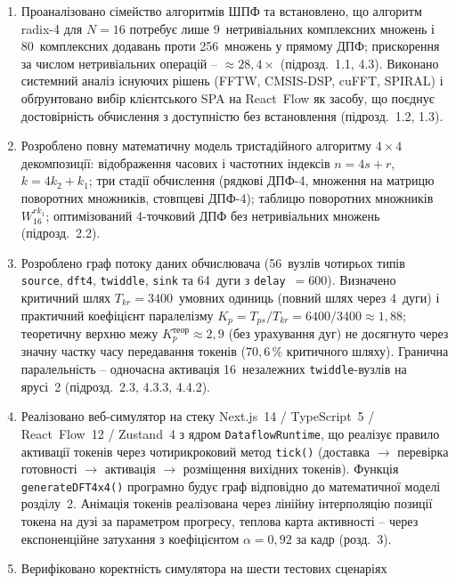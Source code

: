 \documentclass[
]{article}
\begin{document}
\begin{enumerate}
\def\labelenumi{\arabic{enumi}.}
\item
  Проаналізовано сімейство алгоритмів ШПФ та встановлено, що алгоритм
  radix-4 для \(N = 16\) потребує лише 9~нетривіальних комплексних
  множень і 80~комплексних додавань проти 256~множень у прямому ДПФ;
  прискорення за числом нетривіальних операцій --
  \(\approx 28,4 \times\) (підрозд.~1.1, 4.3). Виконано системний аналіз
  існуючих рішень (FFTW, CMSIS-DSP, cuFFT, SPIRAL) і обґрунтовано вибір
  клієнтського SPA на React~Flow як засобу, що поєднує достовірність
  обчислення з доступністю без встановлення (підрозд.~1.2, 1.3).
\item
  Розроблено повну математичну модель тристадійного алгоритму
  \(4 \times 4\) декомпозиції: відображення часових і частотних індексів
  \(n = 4s + r\), \(k = 4k_{2} + k_{1}\); три стадії
  обчислення (рядкові ДПФ-4, множення на матрицю поворотних множників,
  стовпцеві ДПФ-4); таблицю поворотних множників \(W_{16}^{rk_{1}}\);
  оптимізований 4-точковий ДПФ без нетривіальних множень
  (підрозд.~2.2).
\item
  Розроблено граф потоку даних обчислювача (56~вузлів чотирьох типів
  \texttt{source}, \texttt{dft4}, \texttt{twiddle}, \texttt{sink} та
  64~дуги з \texttt{delay}~\(= 600\)). Визначено критичний шлях
  \(T_{kr} = 3400\)~умовних одиниць (повний шлях через 4~дуги) і
  практичний коефіцієнт паралелізму
  \(K_{p} = T_{ps}/T_{kr} = 6400/3400 \approx 1{,}88\); теоретичну
  верхню межу \(K_{p}^{\text{теор}} \approx 2{,}9\) (без урахування дуг)
  не досягнуто через значну частку часу передавання токенів
  (\(70{,}6\,\%\) критичного шляху). Гранична паралельність -- одночасна
  активація 16~незалежних \texttt{twiddle}-вузлів на ярусі~2
  (підрозд.~2.3, 4.3.3, 4.4.2).
\item
  Реалізовано веб-симулятор на стеку Next.js~14 / TypeScript~5 /
  React~Flow~12 / Zustand~4 з ядром \texttt{DataflowRuntime}, що
  реалізує правило активації токенів через чотирикроковий метод
  \texttt{tick}\texttt{()} (доставка \(\rightarrow\) перевірка
  готовності \(\rightarrow\) активація \(\rightarrow\) розміщення
  вихідних токенів). Функція \texttt{generateDFT4x4()} програмно будує
  граф відповідно до математичної моделі розділу~2. Анімація токенів
  реалізована через лінійну інтерполяцію позиції токена на дузі за
  параметром прогресу, теплова карта активності -- через експоненційне
  затухання з коефіцієнтом \(\alpha = 0{,}92\) за кадр (розд.~3).
\item
  Верифіковано коректність симулятора на шести тестових сценаріях

\end{enumerate}
\end{document}
